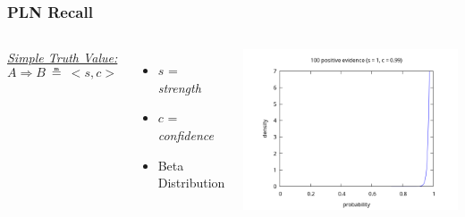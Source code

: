 \documentclass[aspectratio=169]{beamer}
\newcommand{\limp}{\Rightarrow}
\newcommand{\STV}[2]{<\!#1, #2\!>}
\begin{document}
\begin{frame}
  \frametitle{PLN Recall}
  \begin{columns}
    \column{5cm}
    \underline{\emph{Simple Truth Value:}}
    $$A \limp B\ \measeq\ \STV{s}{c}$$
    \begin{itemize}
    \item $s$ = \emph{strength}
    \item $c$ = \emph{confidence}
    \item Beta Distribution
    \end{itemize}
    \column{10cm}
    \includegraphics[scale=0.4]{figs/observations_0_100.png}
  \end{columns}
\end{frame}
\end{document}
